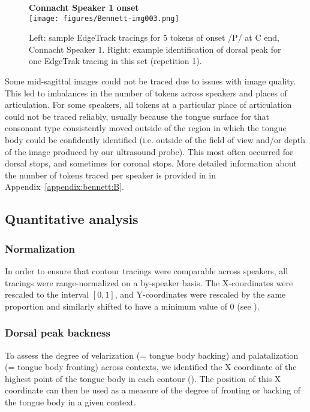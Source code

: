 \documentclass[output=paper,colorlinks,citecolor=brown]{langscibook}
\newcommand{\pal}{\ipa{ʲ}}
\begin{document}
\begin{figure}[!ht]
    \centering
    \textbf{Connacht Speaker 1 onset }\\
    \texttt{[image: figures/Bennett-img003.png]}
    \caption{Left: sample EdgeTrack tracings for 5 tokens of onset /P\pal{}/ at C end, Connacht Speaker 1. Right: example identification of dorsal peak
    for one EdgeTrak tracing in this set (repetition 1).}
    \label{fig:EdgeTrak}
\end{figure}

Some mid-sagittal images could not be traced due to issues with image quality. This led to imbalances in the number of tokens across speakers and places of articulation. For some speakers, all tokens at a particular place of articulation could not be traced reliably, usually because the tongue surface for that consonant type consistently moved outside of the region in which the tongue body could be confidently identified (i.e. outside of the field of view and/or depth of the image produced by our ultrasound probe). This most often occurred for dorsal stops, and sometimes for coronal stops. More detailed information about the number of tokens traced per speaker is provided in  in Appendix~\ref{appendix:bennett:B}.



\subsection{Quantitative analysis}

\subsubsection{Normalization}
In order to ensure that contour tracings were comparable across speakers, all tracings were range-normalized on a by-speaker basis. The X-coordinates were rescaled to the interval $[0,1]$, and Y-coordinates were rescaled by the same proportion and similarly shifted to have a minimum value of 0 (see ).

\subsubsection{Dorsal peak backness}
To assess the degree of velarization (= tongue body backing) and palatalization (= tongue body fronting) across contexts, we identified the X coordinate of the highest point of the tongue body in each contour (). The position of this X coordinate can then be used as a measure of the degree of fronting or backing of the tongue body in a given context.
\end{document}
